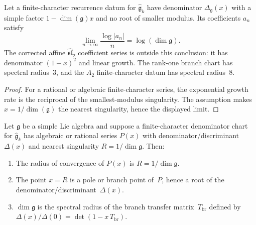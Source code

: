 \begin{corollary}
\label{cor:growth-rate-dimg}
Let a finite-character recurrence datum for
$\widehat{\mathfrak{g}}_k$ have denominator
$\Delta_{\mathfrak{g}}(x)$ with a simple factor
$1-\dim(\mathfrak{g})x$ and no root of smaller modulus.  Its
coefficients $a_n$ satisfy
\[
\lim_{n \to \infty} \frac{\log |a_n|}{n} = \log(\dim \mathfrak{g}).
\]
The corrected affine $\widehat{\mathfrak{sl}}_2$ coefficient series is
outside this conclusion: it has denominator $(1-x)^2$ and linear
growth.  The rank-one branch chart has spectral radius~$3$, and the
$A_2$ finite-character datum has spectral radius~$8$.
\end{corollary}

\begin{proof}
For a rational or algebraic finite-character series, the exponential
growth rate is the reciprocal of the smallest-modulus singularity.  The
assumption makes $x=1/\dim(\mathfrak{g})$ the nearest singularity, hence
the displayed limit.
\end{proof}

\begin{theorem}
\label{thm:dominant-branch-point}
Let $\mathfrak{g}$ be a simple Lie algebra and suppose a
finite-character denominator chart for $\widehat{\mathfrak{g}}_k$ has
algebraic or rational series $P(x)$ with denominator/discriminant
$\Delta(x)$ and nearest singularity $R=1/\dim\mathfrak{g}$. Then:
\begin{enumerate}[label=\textup{(\roman*)}]
\item The radius of convergence of $P(x)$ is
 $R = 1/\dim\mathfrak{g}$.
\item The point $x = R$ is a pole or branch point of~$P$, hence a root
 of the denominator/discriminant~$\Delta(x)$.
\item $\dim\mathfrak{g}$ is the spectral radius of the branch
 transfer matrix~$T_{\mathrm{br}}$ defined by
 $\Delta(x)/\Delta(0) = \det(1 - x\,T_{\mathrm{br}})$.
\end{enumerate}
\end{theorem}

